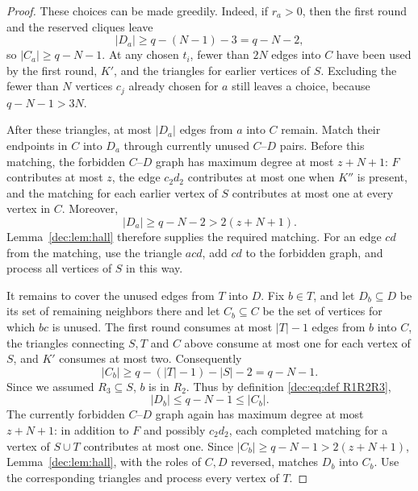 \documentclass[11pt]{article}
\numberwithin{equation}{section}
\theoremstyle{remark}
\begin{document}
\begin{proof}
These choices can be made greedily.  Indeed, if \(r_a>0\),
then the first round and the reserved cliques leave
\begin{equation*}
 |D_a|\ge q-(N-1)-3=q-N-2,
\end{equation*}
so \(|C_a|\ge q-N-1\). At any chosen \(t_i\), fewer than \(2N\) edges into \(C\) have
been used by the first round, \(K'\), and the triangles for earlier vertices of \(S\).
Excluding the fewer than \(N\) vertices \(c_j\) already chosen for \(a\) still leaves
a choice, because \(q-N-1>3N\).

After these triangles, at most \(|D_a|\) edges from \(a\) into
\(C\) remain. Match their endpoints in \(C\) into \(D_a\) through
currently unused \(C\)--\(D\) pairs. Before this matching, the forbidden
\(C\)--\(D\) graph has maximum degree at most \(z+N+1\):
\(F\) contributes at most \(z\), the edge \(c_2d_2\) contributes at most
one when \(K''\) is present, and the matching for each earlier vertex of
\(S\) contributes at most one at every vertex in \(C\).  Moreover,
\begin{equation*}
 |D_a|\ge q-N-2>2(z+N+1).
\end{equation*}
Lemma~\ref{dec:lem:hall} therefore supplies the required matching.
For an edge \(cd\) from the matching, use the triangle \(acd\), add \(cd\) to the
forbidden graph, and process all vertices of \(S\) in this way.

It remains to cover the unused edges from \(T\) into \(D\).  Fix \(b\in T\),
and let \(D_b\subseteq D\) be its set of remaining neighbors there and
let \(C_b\subseteq C\) be the set of vertices for which \(bc\) is unused.
The first round consumes at most \(|T|-1\) edges from \(b\) into \(C\), the
triangles connecting \(S,T\) and \(C\) above consume at most one for each
vertex of \(S\), and \(K'\) consumes at most two.  Consequently
\begin{equation*}
 |C_b|\ge q-(|T|-1)-|S|-2=q-N-1.
\end{equation*}
Since we assumed \(R_3\subseteq S\), \(b\) is in \(R_2\). Thus by definition \eqref{dec:eq:def R1R2R3},
\begin{equation*}
 |D_b|\le q-N-1\le|C_b|.
\end{equation*}
The currently forbidden \(C\)--\(D\) graph again has maximum degree at
most \(z+N+1\): in addition to \(F\) and possibly \(c_2d_2\), each completed
matching for a vertex of \(S\cup T\) contributes at most one.  Since
\(|C_b|\ge q-N-1>2(z+N+1)\), Lemma~\ref{dec:lem:hall}, with the roles of
\(C,D\) reversed, matches \(D_b\) into \(C_b\).  Use the corresponding
triangles and process every vertex of \(T\).


\end{proof}
\end{document}
